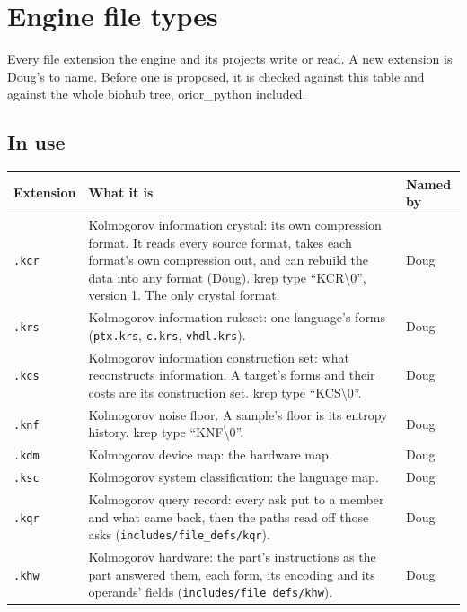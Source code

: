 \chapter{\texorpdfstring{Engine file types}{Engine file types}}
\label{chap:file-types-table}

Every file extension the engine and its projects write or read. A new extension is Doug's to name. Before one is proposed, it is checked against this table and against the whole biohub tree, orior\_\allowbreak{}python included.

\section{\texorpdfstring{In use}{In use}}

{\small
\setlength{\tabcolsep}{6pt}
\begin{longtable}{>{\RaggedRight\arraybackslash}p{}>{\RaggedRight\arraybackslash}p{}>{\RaggedRight\arraybackslash}p{}}
\toprule
Extension & What it is & Named by \\
\midrule
\endhead
\texttt{.\allowbreak{}kcr} & Kolmogorov information crystal: its own compression format. It reads every source format, takes each format's own compression out, and can rebuild the data into any format (Doug). krep type “KCR\textbackslash{}0”, version 1. The only crystal format. & Doug \\
\texttt{.\allowbreak{}krs} & Kolmogorov information ruleset: one language's forms (\texttt{ptx.\allowbreak{}krs}, \texttt{c.\allowbreak{}krs}, \texttt{vhdl.\allowbreak{}krs}). & Doug \\
\texttt{.\allowbreak{}kcs} & Kolmogorov information construction set: what reconstructs information. A target's forms and their costs are its construction set. krep type “KCS\textbackslash{}0”. & Doug \\
\texttt{.\allowbreak{}knf} & Kolmogorov noise floor. A sample's floor is its entropy history. krep type “KNF\textbackslash{}0”. & Doug \\
\texttt{.\allowbreak{}kdm} & Kolmogorov device map: the hardware map. & Doug \\
\texttt{.\allowbreak{}ksc} & Kolmogorov system classification: the language map. & Doug \\
\texttt{.\allowbreak{}kqr} & Kolmogorov query record: every ask put to a member and what came back, then the paths read off those asks (\texttt{includes/\allowbreak{}file\_\allowbreak{}defs/\allowbreak{}kqr}). & Doug \\
\texttt{.\allowbreak{}khw} & Kolmogorov hardware: the part's instructions as the part answered them, each form, its encoding and its operands' fields (\texttt{includes/\allowbreak{}file\_\allowbreak{}defs/\allowbreak{}khw}). & Doug \\
\bottomrule
\end{longtable}
}

